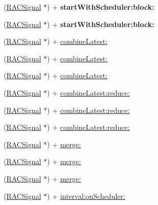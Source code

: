 \begin{DoxyCompactItemize}
(\mbox{\hyperlink{interface_r_a_c_signal}{R\+A\+C\+Signal}} $\ast$) + {\bfseries start\+With\+Scheduler\+:block\+:}
\item 
\mbox{\label{interface_r_a_c_signal_a06ac2ec4a0d7d06cfc61b0ba934a31ac}} 
(\mbox{\hyperlink{interface_r_a_c_signal}{R\+A\+C\+Signal}} $\ast$) + {\bfseries start\+With\+Scheduler\+:block\+:}
\item 
(\mbox{\hyperlink{interface_r_a_c_signal}{R\+A\+C\+Signal}} $\ast$) + \mbox{\hyperlink{interface_r_a_c_signal_a8a7a563a48665fb1203e2b37db6e5e98}{combine\+Latest\+:}}
\item 
(\mbox{\hyperlink{interface_r_a_c_signal}{R\+A\+C\+Signal}} $\ast$) + \mbox{\hyperlink{interface_r_a_c_signal_a8a7a563a48665fb1203e2b37db6e5e98}{combine\+Latest\+:}}
\item 
(\mbox{\hyperlink{interface_r_a_c_signal}{R\+A\+C\+Signal}} $\ast$) + \mbox{\hyperlink{interface_r_a_c_signal_a8a7a563a48665fb1203e2b37db6e5e98}{combine\+Latest\+:}}
\item 
(\mbox{\hyperlink{interface_r_a_c_signal}{R\+A\+C\+Signal}} $\ast$) + \mbox{\hyperlink{interface_r_a_c_signal_a5e4d2db914a14c415646d9fdda131221}{combine\+Latest\+:reduce\+:}}
\item 
(\mbox{\hyperlink{interface_r_a_c_signal}{R\+A\+C\+Signal}} $\ast$) + \mbox{\hyperlink{interface_r_a_c_signal_a5e4d2db914a14c415646d9fdda131221}{combine\+Latest\+:reduce\+:}}
\item 
(\mbox{\hyperlink{interface_r_a_c_signal}{R\+A\+C\+Signal}} $\ast$) + \mbox{\hyperlink{interface_r_a_c_signal_a5e4d2db914a14c415646d9fdda131221}{combine\+Latest\+:reduce\+:}}
\item 
(\mbox{\hyperlink{interface_r_a_c_signal}{R\+A\+C\+Signal}} $\ast$) + \mbox{\hyperlink{interface_r_a_c_signal_a37d7e9c259ad5253a1f3ff644a86e52b}{merge\+:}}
\item 
(\mbox{\hyperlink{interface_r_a_c_signal}{R\+A\+C\+Signal}} $\ast$) + \mbox{\hyperlink{interface_r_a_c_signal_a37d7e9c259ad5253a1f3ff644a86e52b}{merge\+:}}
\item 
(\mbox{\hyperlink{interface_r_a_c_signal}{R\+A\+C\+Signal}} $\ast$) + \mbox{\hyperlink{interface_r_a_c_signal_a37d7e9c259ad5253a1f3ff644a86e52b}{merge\+:}}
\item 
(\mbox{\hyperlink{interface_r_a_c_signal}{R\+A\+C\+Signal}} $\ast$) + \mbox{\hyperlink{interface_r_a_c_signal_a65442f423ebf08b9217f7bb206780a45}{interval\+:on\+Scheduler\+:}}
\item 

\end{DoxyCompactItemize}
